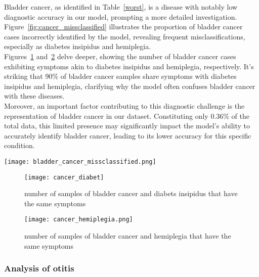 Bladder cancer, as identified in Table~\ref{worst}, is a disease with notably low diagnostic accuracy in our model,
prompting a more detailed investigation. Figure~\ref{fig:cancer_missclassified}
illustrates the proportion of bladder cancer cases incorrectly identified by the model, revealing frequent misclassifications,
especially as diabetes insipidus and hemiplegia.\\
Figures~\ref{fig:cancer_diabet} and~\ref{fig:caner_hemiplegia} delve deeper, showing the number of bladder cancer cases exhibiting
symptoms akin to diabetes insipidus and hemiplegia, respectively. It's striking that 90\% of bladder cancer samples share
symptoms with diabetes insipidus and hemiplegia, clarifying why the model often confuses bladder cancer with these diseases.\\
Moreover, an important factor contributing to this diagnostic challenge is the representation of bladder cancer in our dataset.
Constituting only 0.36\% of the total data, this limited presence may significantly impact the model's ability to accurately identify bladder cancer,
leading to its lower accuracy for this specific condition.
\begin{figure*}[htbp]
	\centering
	\texttt{[image: bladder\_cancer\_missclassified.png]}
	\caption{Percentage of bladder cancer samples misclassified}\label{fig:cancer_missclassified}
\end{figure*}
\noindent

\begin{figure}[H]
	\centering
	\texttt{[image: cancer\_diabet]}
	\caption{number of samples of bladder cancer and diabets insipidus that have the same symptoms}\label{fig:cancer_diabet}
\end{figure}
\noindent

\begin{figure}[H]
	\centering
	\texttt{[image: cancer\_hemiplegia.png]}
	\caption{number of samples of bladder cancer and hemiplegia that have the same symptoms}\label{fig:caner_hemiplegia}
\end{figure}
\noindent

\subsubsection*{Analysis of otitis}

